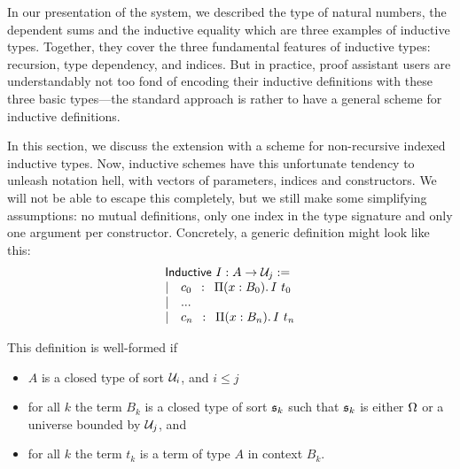 In our presentation of the system, we described the type of natural numbers, 
% 
% 
the dependent sums and the inductive equality which are three examples of
inductive types.
% 
Together, they cover the three fundamental features of inductive types: 
recursion, type dependency, and indices. 
% 
But in practice, proof assistant users are understandably not too fond
of encoding their inductive definitions with these three basic types---the 
standard approach is rather to have a general scheme for inductive 
definitions.

In this section, we discuss the extension \SetoidCC with a scheme for 
non-recursive indexed inductive types.
% 
Now, inductive schemes have this unfortunate tendency to unleash 
notation hell, with vectors of parameters, indices and constructors. 
% 
We will not be able to escape this completely, but we still make some 
simplifying assumptions:
% 
no mutual definitions, only one index in the type signature and only one 
argument per constructor. Concretely, a generic definition might look like this:\\
\[
\begin{array}{l}
\mathsf{Inductive}\ I : A \to \mathcal{U}_j := \\
| \quad c_0 \enskip : \enskip \Pi (x : B_0).\, {I\ t_0}\\
| \quad ... \\
| \quad c_n \enskip : \enskip \Pi (x : B_n).\, {I\ t_n}
\end{array}
\]

This definition is well-formed if 
\begin{itemize}
  \item \( A \) is a closed type of sort \( \mathcal{U}_i \), and \( i \le j \)
  \item for all \( k \) the term \( B_k \) is a closed type of sort \( \mathfrak{s}_k \) 
  such that \( \mathfrak{s}_k \) is either \( \Omega \) or a universe bounded by \( \mathcal{U}_j \), and
  \item for all \( k \) the term \( t_k \) is a term of type \( A \) in context \( B_k \).
\end{itemize}

